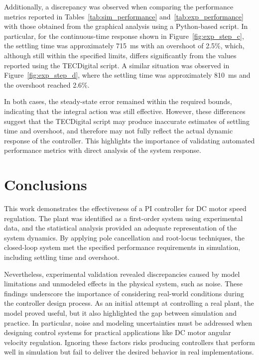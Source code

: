 \documentclass[conference]{IEEEtran}
\begin{document}
Additionally, a discrepancy was observed when comparing the performance metrics
reported in Tables~\ref{tab:sim_performance} and~\ref{tab:exp_performance} with
those obtained from the graphical analysis using a Python-based script. In
particular, for the continuous-time response shown in Figure~\ref{fig:exp_step_c},
the settling time was approximately \SI{715}{\milli\second} with an overshoot of
2.5\%, which, although still within the specified limits, differs significantly
from the values reported using the TECDigital script. A similar situation was
observed in Figure~\ref{fig:exp_step_d}, where the settling time was approximately
\SI{810}{\milli\second} and the overshoot reached 2.6\%. 

In both cases, the steady-state error remained within the required bounds,
indicating that the integral action was still effective. However, these
differences suggest that the TECDigital script may produce inaccurate estimates
of settling time and overshoot, and therefore may not fully reflect the actual
dynamic response of the controller. This highlights the importance of validating
automated performance metrics with direct analysis of the system response.


\section{Conclusions}

This work demonstrates the effectiveness of a PI controller for DC motor speed regulation. The plant was identified as a first-order system using experimental data, and the statistical analysis provided an adequate representation of the system dynamics. By applying pole cancellation and root-locus techniques, the closed-loop system met the specified performance requirements in simulation, including settling time and overshoot.

Nevertheless, experimental validation revealed discrepancies caused by model limitations and unmodeled effects in the physical system, such as noise. These findings underscore the importance of considering real-world conditions during the controller design process. As an initial attempt at controlling a real plant, the model proved useful, but it also highlighted the gap between simulation and practice. In particular, noise and modeling uncertainties must be addressed when designing control systems for practical applications like DC motor angular velocity regulation. Ignoring these factors risks producing controllers that perform well in simulation but fail to deliver the desired behavior in real implementations.
\end{document}
